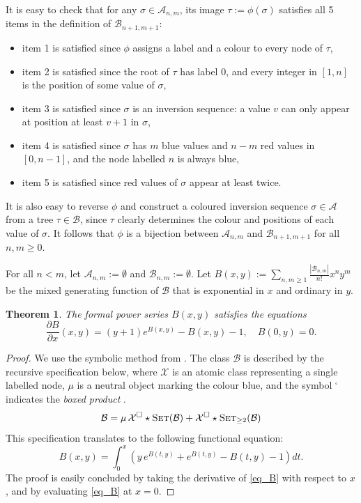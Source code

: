 \documentclass[a4paper,11pt]{article}
\newtheorem{thm}{Theorem}
\theoremstyle{definition}
\theoremstyle{remark}
\begin{document}
It is easy to check that for any $\sigma \in \mathcal A_{n,m}$, its image $\tau := \phi(\sigma)$ satisfies all 5 items in the definition of $\mathcal B_{n+1,m+1}$:
\begin{itemize}
    \item item 1 is satisfied since $\phi$ assigns a label and a colour to every node of $\tau$,
    \item item 2 is satisfied since the root of $\tau$ has label 0, and every integer in $[1,n]$ is the position of some value of $\sigma$,
    \item item 3 is satisfied since $\sigma$ is an inversion sequence: a value $v$ can only appear at position at least $v+1$ in $\sigma$,
    \item item 4 is satisfied since $\sigma$ has $m$ blue values and $n-m$ red values in $[0,n-1]$, and the node labelled $n$ is always blue,
    \item item 5 is satisfied since red values of $\sigma$ appear at least twice.
\end{itemize}
It is also easy to reverse $\phi$ and construct a coloured inversion sequence $\sigma \in \mathcal A$ from a tree $\tau \in \mathcal B$, since $\tau$ clearly determines the colour and positions of each value of $\sigma$. It follows that $\phi$ is a bijection between $\mathcal A_{n,m}$ and $\mathcal B_{n+1,m+1}$ for all $n,m \geq 0$.

For all $n < m$, let $\mathcal A_{n,m} := \emptyset$ and $\mathcal B_{n,m} := \emptyset$. Let $B(x,y) := \sum_{n,m \geq 1} \frac{|\mathcal B_{n,m}|}{n!} x^n y^m$ be the mixed generating function of $\mathcal B$ that is exponential in $x$ and ordinary in $y$.
\begin{thm}
    The formal power series $B(x,y)$ satisfies the equations
    $$\frac{\partial B}{\partial x} (x,y) = (y+1)e^{B(x,y)} - B(x,y) - 1, \quad B(0,y)=0.$$
\end{thm}
\begin{proof}
We use the symbolic method from \cite[Part A]{Flajolet_Sedgewick}. The class $\mathcal B$ is described by the recursive specification below, where $\mathcal X$ is an atomic class representing a single labelled node, $\mu$ is a neutral object marking the colour blue, and the symbol $^\square$ indicates the \emph{boxed product} \cite[page 139]{Flajolet_Sedgewick}. 
$$\mathcal B = \mu \, \mathcal X^\square \star \textsc{Set}(\mathcal B) + \mathcal X^\square \star \textsc{Set}_{\geq 2}(\mathcal B)$$
This specification translates to the following functional equation:
\begin{equation} \label{eq_B}
    B(x,y) = \int_0^x \left ( y \, e^{B(t,y)} +  e^{B(t,y)} - B(t,y) - 1 \right ) dt.
\end{equation}
The proof is easily concluded by taking the derivative of \eqref{eq_B} with respect to $x$, and by evaluating \eqref{eq_B} at $x=0$.
\end{proof}
\end{document}
